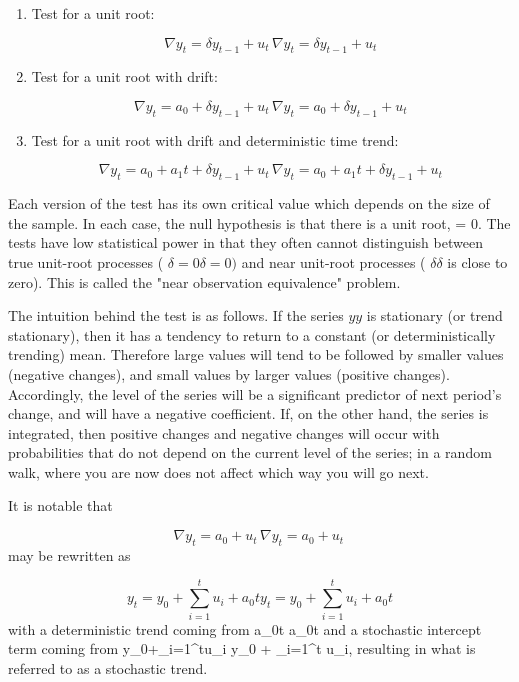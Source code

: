\begin{enumerate}
\item Test for a unit root:

\[{\displaystyle \nabla y_{t}=\delta y_{t-1}+u_{t}\,} \nabla y_t =\delta y_{t-1}+u_t \,\]
\item Test for a unit root with drift:

\[{\displaystyle \nabla y_{t}=a_{0}+\delta y_{t-1}+u_{t}\,} \nabla y_t =a_0+\delta y_{t-1}+u_t \,\]
\item Test for a unit root with drift and deterministic time trend:

\[{\displaystyle \nabla y_{t}=a_{0}+a_{1}t+\delta y_{t-1}+u_{t}\,} \nabla y_t = a_0+a_1t+\delta y_{t-1}+u_t \,\]
\end{enumerate}
Each version of the test has its own critical value which depends on the size of the sample. In each case, the null hypothesis is that there is a unit root, {\displaystyle {}} \delta = 0. The tests have low statistical power in that they often cannot distinguish between true unit-root processes ( ${\displaystyle \delta =0} \delta = 0)$ and near unit-root processes ( ${\displaystyle \delta } \delta$  is close to zero). This is called the "near observation equivalence" problem.

The intuition behind the test is as follows. If the series ${\displaystyle y} y$ is stationary (or trend stationary), then it has a tendency to return to a constant (or deterministically trending) mean. Therefore large values will tend to be followed by smaller values (negative changes), and small values by larger values (positive changes). Accordingly, the level of the series will be a significant predictor of next period's change, and will have a negative coefficient. If, on the other hand, the series is integrated, then positive changes and negative changes will occur with probabilities that do not depend on the current level of the series; in a random walk, where you are now does not affect which way you will go next.

It is notable that

\[{\displaystyle \nabla y_{t}=a_{0}+u_{t}\,} \nabla y_t =a_0 + u_t \,\]
may be rewritten as

\[{\displaystyle y_{t}=y_{0}+\sum _{i=1}^{t}u_{i}+a_{0}t} y_t = y_0 + \sum_{i=1}^t u_i + a_0t \]
with a deterministic trend coming from {\displaystyle a_{0}t} a_0t and a stochastic intercept term coming from {\displaystyle y_{0}+\sum _{i=1}^{t}u_{i}} y_0 + \sum_{i=1}^t u_i, resulting in what is referred to as a stochastic trend.

